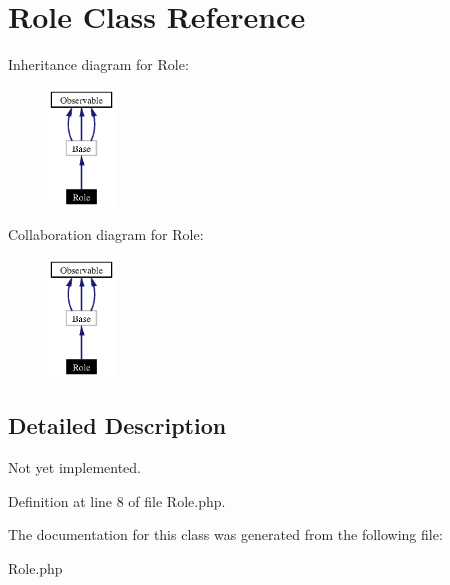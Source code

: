 \section{Role Class Reference}
\label{classRole}
Inheritance diagram for Role:\begin{figure}[H]
\begin{center}
\leavevmode
\includegraphics[width=50pt]{classRole__inherit__graph}
\end{center}
\end{figure}
Collaboration diagram for Role:\begin{figure}[H]
\begin{center}
\leavevmode
\includegraphics[width=50pt]{classRole__coll__graph}
\end{center}
\end{figure}


\subsection{Detailed Description}
Not yet implemented. 



Definition at line 8 of file Role.php.

The documentation for this class was generated from the following file:\begin{CompactItemize}
\item 
Role.php\end{CompactItemize}
